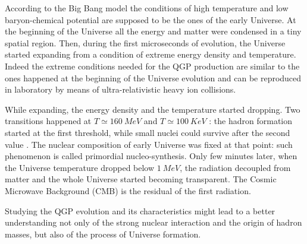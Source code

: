 According to the Big Bang model the conditions of high temperature and low baryon-chemical potential are supposed to be the ones of the early Universe.
At the beginning of the Universe all the energy and matter were condensed in a tiny spatial region.
Then, during the first microseconds of evolution, the Universe started expanding from a condition of extreme energy density and temperature.
Indeed the extreme conditions needed for the QGP production are similar to the ones happened at the beginning of the Universe evolution and can be reproduced in laboratory by means of ultra-relativistic heavy ion collisions.

While expanding, the energy density and the temperature started dropping.
Two transitions happened at $T\simeq160\ MeV$ and $T\simeq100\ KeV$ \cite{Kapoyannis:2017hcz}: the hadron formation started at the first threshold, while small nuclei could survive after the second value \cite{Dumitru:2000sc}.
The nuclear composition of early Universe was fixed at that point: such phenomenon is called primordial nucleo-synthesis.
Only few minutes later, when the Universe temperature dropped below $1\ MeV$, the radiation decoupled from matter and the whole Universe started becoming transparent.
The Cosmic Microwave Background (CMB) is the residual of the first radiation.

Studying the QGP evolution and its characteristics might lead to a better understanding not only of the strong nuclear interaction and the origin of hadron masses, but also of the process of Universe formation.

